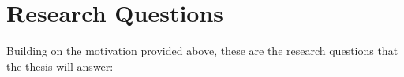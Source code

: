 







\section{Research Questions}
Building on the motivation provided above, these are the research questions that the thesis will answer:


